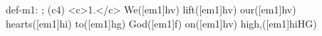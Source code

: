 def-m1: \grealign;
(c4) <c>1.</c> We([em1]hv) lift([em1]hv) our([em1]hv) hearts([em1]hi) to([em1]hg) God([em1]f) on([em1]hv) high,([em1]hiHG)